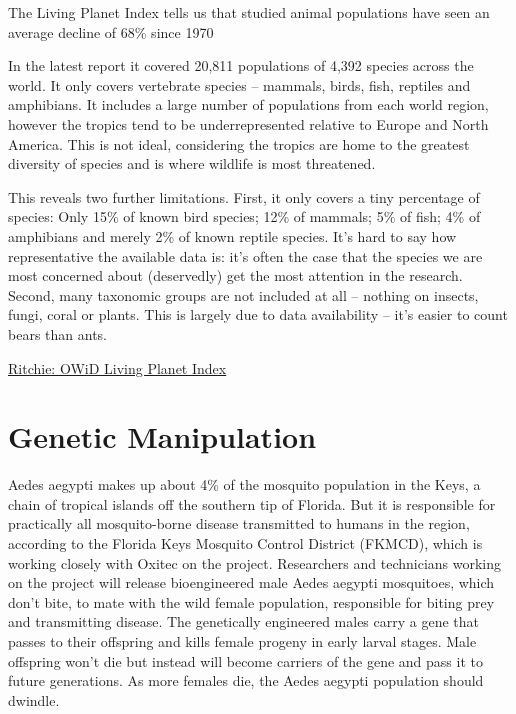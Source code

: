 \documentclass[
]{book}
\begin{document}
The Living Planet Index tells us that studied animal populations have seen an average decline of 68\% since 1970

In the latest report it covered 20,811 populations of 4,392 species across the world. It only covers vertebrate species -- mammals, birds, fish, reptiles and amphibians. It includes a large number of populations from each world region, however the tropics tend to be underrepresented relative to Europe and North America. This is not ideal, considering the tropics are home to the greatest diversity of species and is where wildlife is most threatened.

This reveals two further limitations. First, it only covers a tiny percentage of species: Only 15\% of known bird species; 12\% of mammals; 5\% of fish; 4\% of amphibians and merely 2\% of known reptile species. It's hard to say how representative the available data is: it's often the case that the species we are most concerned about (deservedly) get the most attention in the research. Second, many taxonomic groups are not included at all -- nothing on insects, fungi, coral or plants. This is largely due to data availability -- it's easier to count bears than ants.

\href{https://ourworldindata.org/living-planet-index-decline}{Ritchie: OWiD Living Planet Index}

\hypertarget{genetic-manipulation}{%
\chapter{Genetic Manipulation}\label{genetic-manipulation}}

Aedes aegypti makes up about 4\% of the mosquito population in the Keys, a chain of tropical islands off the southern tip of Florida. But it is responsible for practically all mosquito-borne disease transmitted to humans in the region, according to the Florida Keys Mosquito Control District (FKMCD), which is working closely with Oxitec on the project. Researchers and technicians working on the project will release bioengineered male Aedes aegypti mosquitoes, which don't bite, to mate with the wild female population, responsible for biting prey and transmitting disease. The genetically engineered males carry a gene that passes to their offspring and kills female progeny in early larval stages. Male offspring won't die but instead will become carriers of the gene and pass it to future generations. As more females die, the Aedes aegypti population should dwindle.
\end{document}
